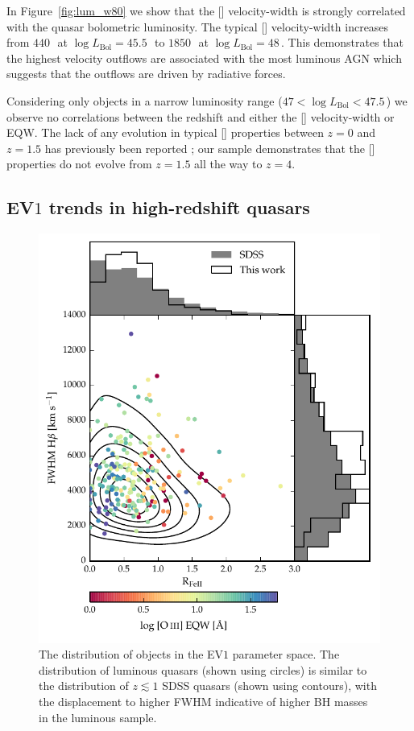 In Figure~\ref{fig:lum_w80} we show that the [] velocity-width is strongly correlated with the quasar bolometric luminosity.
The typical [] velocity-width increases from $440$\,\kms\, at $\log L_{\text{Bol}}=45.5$\,\ergs\, to $1850$\,\kms\, at $\log L_{\text{Bol}}=48$\,\ergs.  
This demonstrates that the highest velocity outflows are associated with the most luminous AGN which suggests that the outflows are driven by radiative forces. 

Considering only objects in a narrow luminosity range ($47 < \log L_{\text{Bol}} < 47.5$\,\ergs) we observe no correlations between the redshift and either the [] velocity-width or EQW.   
The lack of any evolution in typical [] properties between $z=0$ and $z=1.5$ has previously been reported \citep[e.g.][]{harrison16}; our sample demonstrates that the [] properties do not evolve from $z=1.5$ all the way to $z=4$. 

\subsection{EV$1$ trends in high-redshift quasars}

\begin{figure}[t!]
\centering 
    \includegraphics[width=\columnwidth]{figures/chapter04/ev1_lowz.pdf} 
    \caption[{The distribution of objects in the EV$1$ parameter space.}]{The distribution of objects in the EV$1$ parameter space. The distribution of luminous quasars (shown using circles) is similar to the distribution of $z \lesssim 1$ SDSS quasars (shown using contours), with the displacement to higher \hb FWHM indicative of higher BH masses in the luminous sample.}      
    \label{fig:ev1_lowz}
\end{figure}

